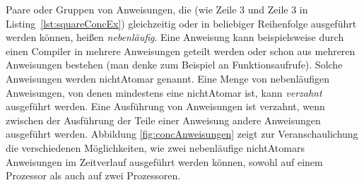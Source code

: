 Paare oder Gruppen von Anweisungen, die (wie Zeile 3 und Zeile 3 in Listing~\ref{lst:squareConcEx}) gleichzeitig oder in beliebiger Reihenfolge ausgeführt werden können, heißen \emph{nebenläufig}. Eine Anweisung kann beispielsweise durch einen Compiler in mehrere Anweisungen geteilt werden oder schon aus mehreren Anweisungen bestehen (man denke zum Beispiel an Funktionsaufrufe). Solche Anweisungen werden \gls{nichtAtomar} genannt. Eine Menge von nebenläufigen Anweisungen, von denen mindestens eine \gls{nichtAtomar} ist, kann \emph{verzahnt} ausgeführt werden. Eine Ausführung von Anweisungen ist verzahnt, wenn zwischen der Ausführung der Teile einer  Anweisung andere Anweisungen ausgeführt werden. Abbildung \ref{fig:concAnweisungen} zeigt zur Veranschaulichung die verschiedenen Möglichkeiten, wie zwei nebenläufige \glspl{nichtAtomar} Anweisungen im Zeitverlauf ausgeführt werden können, sowohl auf einem Prozessor als auch auf zwei Prozessoren. 
